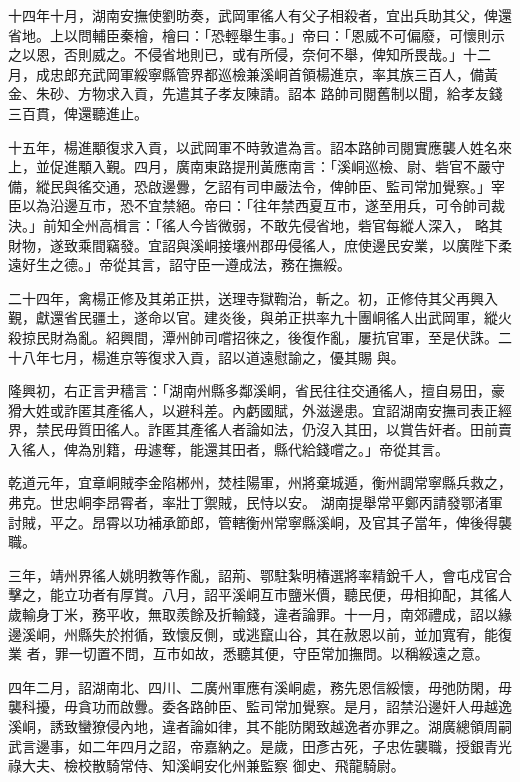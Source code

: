 \begin{pinyinscope}
 十四年十月，湖南安撫使劉昉奏，武岡軍徭人有父子相殺者，宜出兵助其父，俾還省地。上以問輔臣秦檜，檜曰：「恐輕舉生事。」帝曰：「恩威不可偏廢，可懷則示之以恩，否則威之。不侵省地則已，或有所侵，奈何不舉，俾知所畏哉。」十二月，成忠郎充武岡軍綏寧縣管界都巡檢兼溪峒首領楊進京，率其族三百人，備黃金、朱砂、方物求入貢，先遣其子孝友陳請。詔本
 路帥司閱舊制以聞，給孝友錢三百貫，俾還聽進止。



 十五年，楊進顒復求入貢，以武岡軍不時敦遣為言。詔本路帥司閱實應襲人姓名來上，並促進顒入覲。四月，廣南東路提刑黃應南言：「溪峒巡檢、尉、砦官不嚴守備，縱民與徭交通，恐啟邊釁，乞詔有司申嚴法令，俾帥臣、監司常加覺察。」宰臣以為沿邊互市，恐不宜禁絕。帝曰：「往年禁西夏互市，遂至用兵，可令帥司裁決。」前知全州高楫言：「徭人今皆微弱，不敢先侵省地，砦官每縱人深入，
 略其財物，遂致乘間竊發。宜詔與溪峒接壤州郡毋侵徭人，庶使邊民安業，以廣陛下柔遠好生之德。」帝從其言，詔守臣一遵成法，務在撫綏。



 二十四年，禽楊正修及其弟正拱，送理寺獄鞫治，斬之。初，正修侍其父再興入覲，獻還省民疆土，遂命以官。建炎後，與弟正拱率九十團峒徭人出武岡軍，縱火殺掠民財為亂。紹興間，潭州帥司嚐招徠之，後復作亂，屢抗官軍，至是伏誅。二十八年七月，楊進京等復求入貢，詔以道遠慰諭之，優其賜
 與。



 隆興初，右正言尹穡言：「湖南州縣多鄰溪峒，省民往往交通徭人，擅自易田，豪猾大姓或詐匿其產徭人，以避科差。內虧國賦，外滋邊患。宜詔湖南安撫司表正經界，禁民毋質田徭人。詐匿其產徭人者論如法，仍沒入其田，以賞告奸者。田前賣入徭人，俾為別籍，毋遽奪，能還其田者，縣代給錢嚐之。」帝從其言。



 乾道元年，宜章峒賊李金陷郴州，焚桂陽軍，州將棄城遁，衡州調常寧縣兵救之，弗克。世忠峒李昂霄者，率壯丁禦賊，民恃以安。
 湖南提舉常平鄭丙請發鄂渚軍討賊，平之。昂霄以功補承節郎，管轄衡州常寧縣溪峒，及官其子當年，俾後得襲職。



 三年，靖州界徭人姚明教等作亂，詔荊、鄂駐紮明椿選將率精銳千人，會屯戍官合擊之，能立功者有厚賞。八月，詔平溪峒互市鹽米價，聽民便，毋相抑配，其徭人歲輸身丁米，務平收，無取羨餘及折輸錢，違者論罪。十一月，南郊禮成，詔以緣邊溪峒，州縣失於拊循，致懷反側，或逃竄山谷，其在赦恩以前，並加寬宥，能復業
 者，罪一切置不問，互市如故，悉聽其便，守臣常加撫問。以稱綏遠之意。



 四年二月，詔湖南北、四川、二廣州軍應有溪峒處，務先恩信綏懷，毋弛防閑，毋襲科擾，毋貪功而啟釁。委各路帥臣、監司常加覺察。是月，詔禁沿邊奸人毋越逸溪峒，誘致蠻獠侵內地，違者論如律，其不能防閑致越逸者亦罪之。湖廣總領周嗣武言邊事，如二年四月之詔，帝嘉納之。是歲，田彥古死，子忠佐襲職，授銀青光祿大夫、檢校散騎常侍、知溪峒安化州兼監察
 御史、飛龍騎尉。




\end{pinyinscope}
